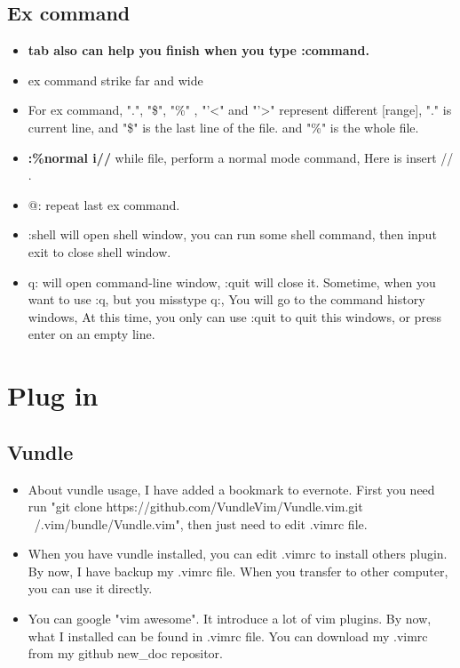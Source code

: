 \documentclass[a4paper,11pt,twoside]{book}
\begin{document}
\subsection{Ex command}
\begin{itemize}
		\item \textbf{tab also can help you finish when you type :command.}
				
		\item ex command strike far and wide
		
		\item  For ex command, ".", "\$", "\%" , "'<"  and "'>" represent different [range], "." is current line, and "\$" is the last line of the file. and "\%" is the whole file.
		
		\item \textbf{:\%normal i//} while file, perform a normal mode command, Here is insert // . 

		\item @: repeat last ex command.
		
		\item :shell will open shell window, you can run some shell command, then input exit to close shell window. 
		
		\item q: will open command-line window, :quit will close it. Sometime, when you want to use :q, but you misstype q:, You will go to the command history windows, At this time, you only can use :quit to quit this windows, or press enter on an empty line.
\end{itemize}

\section{Plug in}

\subsection{Vundle}
\begin{itemize}
		\item About vundle usage, I have added a bookmark to evernote. First you need run "git clone https://github.com/VundleVim/Vundle.vim.git ~/.vim/bundle/Vundle.vim", then just need to edit .vimrc file.  

		\item When you have vundle installed, you can edit .vimrc to install others plugin. By now, I have backup my .vimrc file. When you transfer to other computer, you can use it directly. 

		\item You can google "vim awesome". It introduce a lot of vim plugins. By now, what I installed can be found in .vimrc file. You can download my .vimrc from my github new\_doc repositor.
		\end{itemize}
\end{document}
